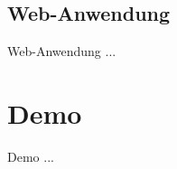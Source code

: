 \documentclass[9pt]{beamer}
\begin{document}
\subsection{Web-Anwendung}

\begin{frame}{Web-Anwendung}{}
	...
\end{frame}

\section{Demo}

\begin{frame}{Demo}{}
	...
\end{frame}
\end{document}
